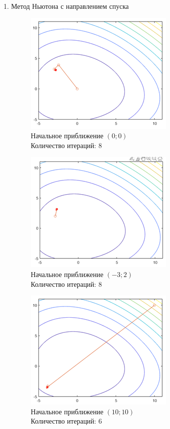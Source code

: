 \documentclass[12pt]{article}
\begin{document}
\begin{enumerate}
\begin{enumerate}
	\item Метод Ньютона с направлением спуска

	\begin{figure}[H]
	\begin{minipage}{.5\textwidth}
    	\centering
    	\includegraphics[]{img/f6_3_1.png}
    	\\ Начальное приближение $\left( 0; 0 \right)$
    	\\ Количество итераций: 8
	\end{minipage}
	\begin{minipage}{.5\textwidth}
    	\centering
    	\includegraphics[]{img/f6_3_2.png}
    	\\ Начальное приближение $\left( -3; 2 \right)$
    	\\ Количество итераций: 8
	\end{minipage}
    \end{figure}

	\begin{figure}[H]
    	\centering
    	\includegraphics[]{img/f6_3_3.png}
    	\\ Начальное приближение $\left( 10; 10 \right)$
    	\\ Количество итераций: 6
    \end{figure}


\end{enumerate}
\end{enumerate}
\end{document}
